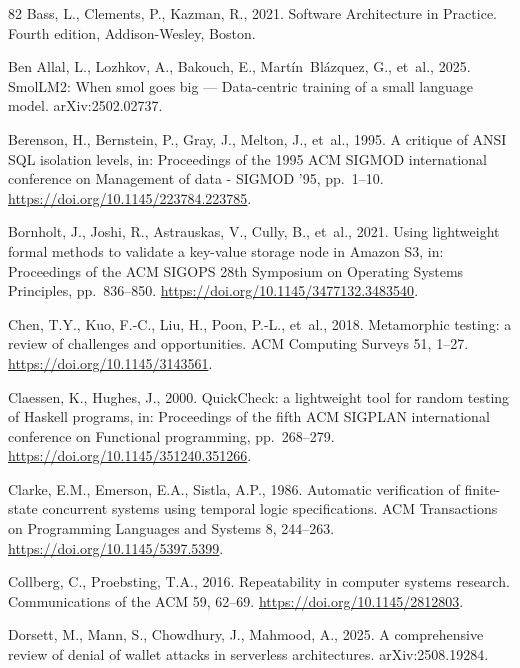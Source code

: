 \documentclass[preprint,3p,authoryear,12pt]{elsarticle}
\begin{document}
\begin{thebibliography}{82}
Bass, L., Clements, P., Kazman, R., 2021. Software Architecture in Practice. Fourth edition, Addison-Wesley, Boston.

Ben Allal, L., Lozhkov, A., Bakouch, E., Mart\'{i}n~Bl\'{a}zquez, G., et~al., 2025.
SmolLM2: When smol goes big --- Data-centric training of a small language model.
arXiv:2502.02737.

Berenson, H., Bernstein, P., Gray, J., Melton, J., et~al., 1995. A critique of ANSI SQL isolation levels, in: Proceedings of the 1995 ACM SIGMOD international conference on Management of data  - SIGMOD '95, pp.~1--10. \url{https://doi.org/10.1145/223784.223785}.

Bornholt, J., Joshi, R., Astrauskas, V., Cully, B., et~al., 2021. Using lightweight formal methods to validate a key-value storage node in Amazon S3, in: Proceedings of the ACM SIGOPS 28th Symposium on Operating Systems Principles, pp.~836--850. \url{https://doi.org/10.1145/3477132.3483540}.

Chen, T.Y., Kuo, F.-C., Liu, H., Poon, P.-L., et~al., 2018. Metamorphic testing: a review of challenges and opportunities. ACM Computing Surveys 51, 1--27. \url{https://doi.org/10.1145/3143561}.

Claessen, K., Hughes, J., 2000. QuickCheck: a lightweight tool for random testing of Haskell programs, in: Proceedings of the fifth ACM SIGPLAN international conference on Functional programming, pp.~268--279. \url{https://doi.org/10.1145/351240.351266}.

Clarke, E.M., Emerson, E.A., Sistla, A.P., 1986. Automatic verification of finite-state concurrent systems using temporal logic specifications. ACM Transactions on Programming Languages and Systems 8, 244--263. \url{https://doi.org/10.1145/5397.5399}.

Collberg, C., Proebsting, T.A., 2016. Repeatability in computer systems research. Communications of the ACM 59, 62--69. \url{https://doi.org/10.1145/2812803}.

Dorsett, M., Mann, S., Chowdhury, J., Mahmood, A., 2025. A comprehensive review of
denial of wallet attacks in serverless architectures. arXiv:2508.19284.


\end{thebibliography}
\end{document}
